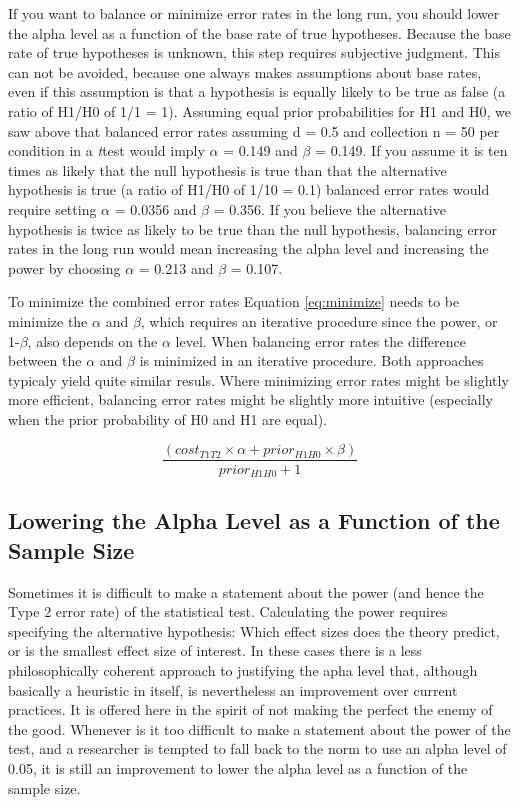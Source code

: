 \documentclass[,jou,floatsintext]{apa6}
\begin{document}
If you want to balance or minimize error rates in the long run, you should lower the alpha level as a function of the base rate of true hypotheses. Because the base rate of true hypotheses is unknown, this step requires subjective judgment. This can not be avoided, because one always makes assumptions about base rates, even if this assumption is that a hypothesis is equally likely to be true as false (a ratio of H1/H0 of 1/1 = 1). Assuming equal prior probabilities for H1 and H0, we saw above that balanced error rates assuming d = 0.5 and collection n = 50 per condition in a \emph{t}test would imply \(\alpha\) = 0.149 and \(\beta\) = 0.149. If you assume it is ten times as likely that the null hypothesis is true than that the alternative hypothesis is true (a ratio of H1/H0 of 1/10 = 0.1) balanced error rates would require setting \(\alpha\) = 0.0356 and \(\beta\) = 0.356. If you believe the alternative hypothesis is twice as likely to be true than the null hypothesis, balancing error rates in the long run would mean increasing the alpha level and increasing the power by choosing \(\alpha\) = 0.213 and \(\beta\) = 0.107.

To minimize the combined error rates Equation \eqref{eq:minimize} needs to be minimize the \(\alpha\) and \(\beta\), which requires an iterative procedure since the power, or 1-\(\beta\), also depends on the \(\alpha\) level. When balancing error rates the difference between the \(\alpha\) and \(\beta\) is minimized in an iterative procedure. Both approaches typicaly yield quite similar resuls. Where minimizing error rates might be slightly more efficient, balancing error rates might be slightly more intuitive (especially when the prior probability of H0 and H1 are equal).

\begin{equation}
\frac{(cost_{T1T2} \times \alpha + prior_{H1H0} \times \beta)}{prior_{H1H0}+1}
\label{eq:minimize}
\end{equation}

\hypertarget{lowering-the-alpha-level-as-a-function-of-the-sample-size}{%
\subsection{Lowering the Alpha Level as a Function of the Sample Size}\label{lowering-the-alpha-level-as-a-function-of-the-sample-size}}

Sometimes it is difficult to make a statement about the power (and hence the Type 2 error rate) of the statistical test. Calculating the power requires specifying the alternative hypothesis: Which effect sizes does the theory predict, or is the smallest effect size of interest. In these cases there is a less philosophically coherent approach to justifying the apha level that, although basically a heuristic in itself, is nevertheless an improvement over current practices. It is offered here in the spirit of not making the perfect the enemy of the good. Whenever is it too difficult to make a statement about the power of the test, and a researcher is tempted to fall back to the norm to use an alpha level of 0.05, it is still an improvement to lower the alpha level as a function of the sample size.
\end{document}
